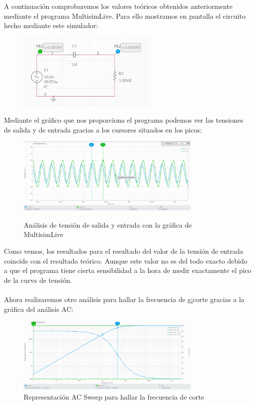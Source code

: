 \documentclass[11pt,letterpaper]{article}
\begin{document}
A continuación comprobaremos los valores teóricos obtenidos anteriormente mediante el programa MultisimLive. Para ello mostramos en pantalla el circuito hecho mediante este simulador:
\begin{figure}[h]
	\centering
	\includegraphics[width=0.6\textwidth]{imagen/circuitoRL_R.png}
\end{figure}
Mediante el gráfico que nos proporciona el programa podemos ver las tensiones de salida y de entrada gracias a los cursores situados en los picos:
\begin{figure}[H]
	\centering
	\includegraphics[width=0.8\textwidth]{imagen/analisispotenciales.png}
	\label{fig:analisispotencial-png}
	\caption{Análisis de tensión de salida y entrada con la gráfica de MultisimLive}
\end{figure}
Como vemos, los resultados para el resultado del valor de la tensión de entrada coincide con el resultado teórico. Aunque este valor no es del todo exacto debido a que el programa tiene cierta sensibilidad a la hora de medir exactamente el pico de la curva de tensión.\\
\\
Ahora realizaremos otro análisis para hallar la frecuencia de g¡corte gracias a la gráfica del análisis AC:
\begin{figure}[H]
	\centering
	\includegraphics[width=0.8\textwidth]{imagen/accorte.png}
	\caption{Representación AC Sweep para hallar la frecuencia de corte}
	\label{fig:imagen-analisisAC-png}
\end{figure}
\end{document}
